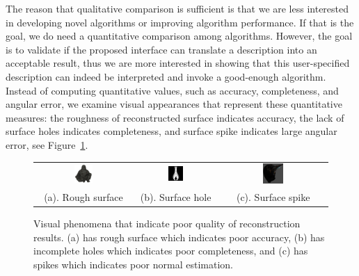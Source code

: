 The reason that qualitative comparison is sufficient is that we are less interested in developing novel algorithms or improving algorithm performance. If that is the goal, we do need a quantitative comparison among algorithms. However, the goal is to validate if the proposed interface can translate a description into an acceptable result, thus we are more interested in showing that this user-specified description can indeed be interpreted and invoke a good-enough algorithm. Instead of computing quantitative values, such as accuracy, completeness, and angular error, we examine visual appearances that represent these quantitative measures: the roughness of reconstructed surface indicates accuracy, the lack of surface holes indicates completeness, and surface spike indicates large angular error, see Figure~\ref{fig:vis_quality}.
\begin{figure}[!htbp]
\centering
\begin{tabular}{ccc}
\includegraphics[width=0.2\textwidth]{img/interp/synth_interp/budda_vh} &
\includegraphics[width=0.2\textwidth]{img/interp/synth_interp/vase0_sl} &
\includegraphics[width=0.2\textwidth]{img/interp/real_interp/vase/vase_spike} \\
(a). Rough surface & (b). Surface hole & (c). Surface spike\\
\end{tabular}
\caption{Visual phenomena that indicate poor quality of reconstruction results. (a) has rough surface which indicates poor accuracy, (b) has incomplete holes which indicates poor completeness, and (c) has spikes which indicates poor normal estimation.}
\label{fig:vis_quality}
\end{figure}

